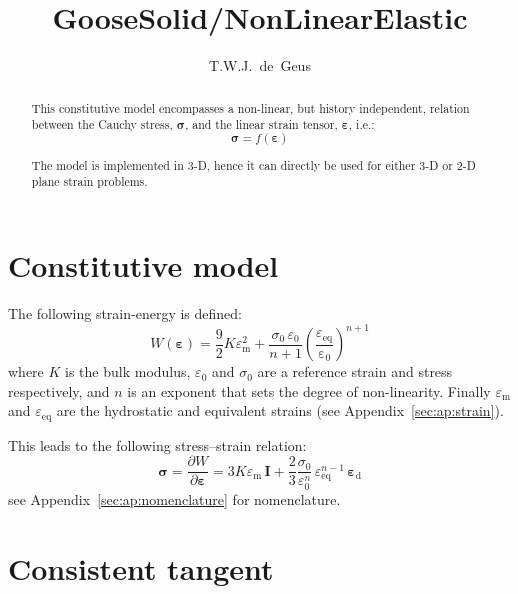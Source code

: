 \documentclass[times,namecite]{goose-article}
\title{%
  GooseSolid/NonLinearElastic
}
\author{T.W.J.~de~Geus}
\begin{document}
\maketitle

\begin{abstract}
This constitutive model encompasses a non-linear, but history independent, relation between the Cauchy stress, $\bm{\sigma}$, and the linear strain tensor, $\bm{\varepsilon}$, i.e.:
\begin{equation*}
  \bm{\sigma} = f \left( \bm{\varepsilon} \right)
\end{equation*}

The model is implemented in 3-D, hence it can directly be used for either 3-D or 2-D plane strain problems.
\end{abstract}


\setcounter{tocdepth}{2}
\tableofcontents

\vfill\newpage
\section{Constitutive model}

The following strain-energy is defined:
%
\begin{equation}
  W ( \bm{\varepsilon} )
  = \frac{9}{2} K \varepsilon_\mathrm{m}^2
  + \frac{ \sigma_0 \, \varepsilon_0 }{ n+1 }
    \left( \frac{\varepsilon_\mathrm{eq}}{\mathrm{\varepsilon_0}} \right)^{n+1}
\end{equation}
%
where $K$ is the bulk modulus, $\varepsilon_0$ and $\sigma_0$ are a reference strain and stress respectively, and $n$ is an exponent that sets the degree of non-linearity. Finally $\varepsilon_\mathrm{m}$ and $\varepsilon_\mathrm{eq}$ are the hydrostatic and equivalent strains (see Appendix~\ref{sec:ap:strain}).

This leads to the following stress--strain relation:
%
\begin{equation}
\label{eq:stress}
  \bm{\sigma}
  = \frac{\partial W}{\partial \bm{\varepsilon}}
  = 3 K \varepsilon_\mathrm{m} \, \bm{I}
  + \frac{2}{3} \frac{\sigma_0}{\varepsilon_0^n} \,
    \varepsilon_\mathrm{eq}^{n-1} \, \bm{\varepsilon}_\mathrm{d}
\end{equation}
%
see Appendix~\ref{sec:ap:nomenclature} for nomenclature.

\section{Consistent tangent}
\end{document}
